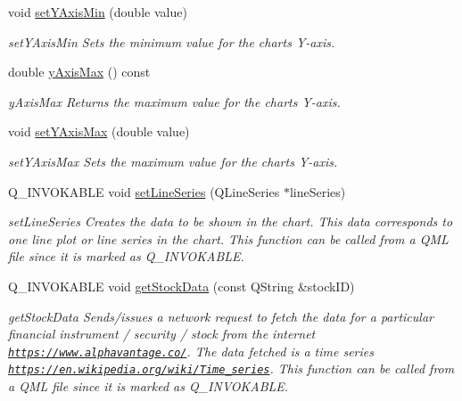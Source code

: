 \begin{DoxyCompactItemize}
void \hyperlink{class_stock_chart_a4cfeb533f5b01e029cb25831252d8f1d}{set\+Y\+Axis\+Min} (double value)
\begin{DoxyCompactList}\small\item\em set\+Y\+Axis\+Min Sets the minimum value for the chart\textquotesingle{}s Y-\/axis. \end{DoxyCompactList}\item 
double \hyperlink{class_stock_chart_a385cf91d047bd0cad511a0e068ed239f}{y\+Axis\+Max} () const
\begin{DoxyCompactList}\small\item\em y\+Axis\+Max Returns the maximum value for the chart\textquotesingle{}s Y-\/axis. \end{DoxyCompactList}\item 
\mbox{\label{class_stock_chart_aeedaaefe37da9b061e2cf4f8a618b7c1}} 
void \hyperlink{class_stock_chart_aeedaaefe37da9b061e2cf4f8a618b7c1}{set\+Y\+Axis\+Max} (double value)
\begin{DoxyCompactList}\small\item\em set\+Y\+Axis\+Max Sets the maximum value for the chart\textquotesingle{}s Y-\/axis. \end{DoxyCompactList}\item 
Q\+\_\+\+I\+N\+V\+O\+K\+A\+B\+LE void \hyperlink{class_stock_chart_a263508e678183faf4ce6a98ecab71405}{set\+Line\+Series} (Q\+Line\+Series $\ast$line\+Series)
\begin{DoxyCompactList}\small\item\em set\+Line\+Series Creates the data to be shown in the chart. This data corresponds to one line plot or line series in the chart. This function can be called from a Q\+ML file since it is marked as Q\+\_\+\+I\+N\+V\+O\+K\+A\+B\+LE. \end{DoxyCompactList}\item 
Q\+\_\+\+I\+N\+V\+O\+K\+A\+B\+LE void \hyperlink{class_stock_chart_ab108485d635146b2dc9bb1192c4371ec}{get\+Stock\+Data} (const Q\+String \&stock\+ID)
\begin{DoxyCompactList}\small\item\em get\+Stock\+Data Sends/issues a network request to fetch the data for a particular financial instrument / security / stock from the internet \href{https://www.alphavantage.co/}{\tt https\+://www.\+alphavantage.\+co/}. The data fetched is a time series \href{https://en.wikipedia.org/wiki/Time_series}{\tt https\+://en.\+wikipedia.\+org/wiki/\+Time\+\_\+series}. This function can be called from a Q\+ML file since it is marked as Q\+\_\+\+I\+N\+V\+O\+K\+A\+B\+LE. \end{DoxyCompactList}\end{DoxyCompactItemize}
